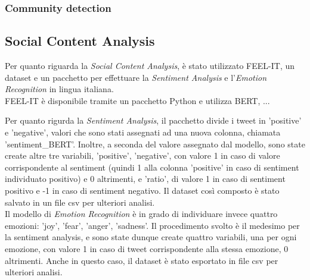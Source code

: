 \documentclass[12pt,journal,compsoc]{IEEEtran}
\begin{document}
\subsubsection{Community detection}

\subsection{Social Content Analysis}
Per quanto riguarda la \textit{Social Content Analysis}, è stato utilizzato FEEL-IT, un dataset e un pacchetto per effettuare la \textit{Sentiment Analysis} e l'\textit{Emotion Recognition} in lingua italiana.\\
FEEL-IT è disponibile tramite un pacchetto Python \cite{FEEL-IT} e utilizza BERT, ...



Per quanto rigurda la \textit{Sentiment Analysis}, il pacchetto divide i tweet in 'positive' e 'negative', valori che sono stati assegnati ad una nuova colonna, chiamata 'sentiment\_BERT'. Inoltre, a seconda del valore assegnato dal modello, sono state create altre tre variabili, 'positive', 'negative', con valore 1 in caso di valore corrispondente al sentiment (quindi 1 alla colonna 'positive' in caso di sentiment individuato positivo) e 0 altrimenti, e 'ratio', di valore 1 in caso di sentiment positivo e -1 in caso di sentiment negativo. Il dataset così composto è stato salvato in un file csv per ulteriori analisi.\\
Il modello di \textit{Emotion Recognition} è in grado di individuare invece quattro emozioni: 'joy', 'fear', 'anger', 'sadness'. Il procedimento svolto è il medesimo per la sentiment analysis, e sono state dunque create quattro variabili, una per ogni emozione, con valore 1 in caso di tweet corrispondente alla stessa emozione, 0 altrimenti. Anche in questo caso, il dataset è stato esportato in file csv per ulteriori analisi.
\end{document}

